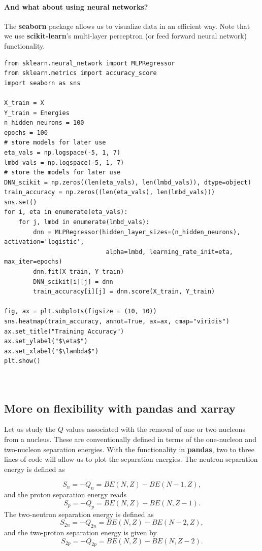 \documentclass[%
oneside,                 %
final,                   %
10pt]{article}
\begin{document}
\paragraph{And what about using neural networks?}
The \textbf{seaborn} package allows us to visualize data in an efficient way. Note that we use \textbf{scikit-learn}'s multi-layer perceptron (or feed forward neural network) 
functionality.
\begin{verbatim}
from sklearn.neural_network import MLPRegressor
from sklearn.metrics import accuracy_score
import seaborn as sns

X_train = X
Y_train = Energies
n_hidden_neurons = 100
epochs = 100
# store models for later use
eta_vals = np.logspace(-5, 1, 7)
lmbd_vals = np.logspace(-5, 1, 7)
# store the models for later use
DNN_scikit = np.zeros((len(eta_vals), len(lmbd_vals)), dtype=object)
train_accuracy = np.zeros((len(eta_vals), len(lmbd_vals)))
sns.set()
for i, eta in enumerate(eta_vals):
    for j, lmbd in enumerate(lmbd_vals):
        dnn = MLPRegressor(hidden_layer_sizes=(n_hidden_neurons), activation='logistic',
                            alpha=lmbd, learning_rate_init=eta, max_iter=epochs)
        dnn.fit(X_train, Y_train)
        DNN_scikit[i][j] = dnn
        train_accuracy[i][j] = dnn.score(X_train, Y_train)

fig, ax = plt.subplots(figsize = (10, 10))
sns.heatmap(train_accuracy, annot=True, ax=ax, cmap="viridis")
ax.set_title("Training Accuracy")
ax.set_ylabel("$\eta$")
ax.set_xlabel("$\lambda$")
plt.show()



\end{verbatim}

\subsection*{More on flexibility with pandas and xarray}

Let us study the $Q$ values associated with the removal of one or two nucleons from
a nucleus. These are conventionally defined in terms of the one-nucleon and two-nucleon
separation energies. With the functionality in \textbf{pandas}, two to three lines of code will allow us to plot the separation energies.
The neutron separation energy is defined as 

\[
S_n= -Q_n= BE(N,Z)-BE(N-1,Z),
\]
and the proton separation energy reads
\[
S_p= -Q_p= BE(N,Z)-BE(N,Z-1).
\]
The two-neutron separation energy is defined as
\[
S_{2n}= -Q_{2n}= BE(N,Z)-BE(N-2,Z),
\]
and  the two-proton separation energy is given by
\[
S_{2p}= -Q_{2p}= BE(N,Z)-BE(N,Z-2).
\]
\end{document}
